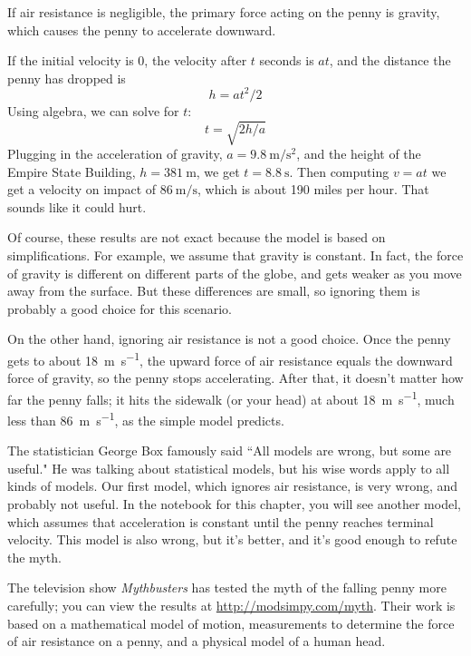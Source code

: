 \documentclass[12pt]{book}
\theoremstyle{exercise}
\begin{document}
If air resistance is negligible, the primary force acting on the penny is gravity, which causes the penny to accelerate downward.

If the initial velocity is 0, the velocity after $t$ seconds is $a t$, and the distance the penny has dropped is
%
\[ h = a t^2 / 2 \]
%
Using algebra, we can solve for $t$:
%
\[ t = \sqrt{ 2 h / a} \]
%
Plugging in the acceleration of gravity, $a = \SI{9.8}{\meter\per\second\squared}$, and the height of the Empire State Building, $h=\SI{381}{\meter}$, we get $t = \SI{8.8}{\second}$.  Then computing $v = a t$ we get a velocity on impact of $\SI{86}{\meter\per\second}$, which is about 190 miles per hour.  That sounds like it could hurt.

Of course, these results are not exact because the model is based on simplifications.  For example, we assume that gravity is constant.  In fact, the force of gravity is different on different parts of the globe, and gets weaker as you move away from the surface.  But these differences are small, so ignoring them is probably a good choice for this scenario.

On the other hand, ignoring air resistance is not a good choice.  Once the penny gets to about \SI{18}{\meter\per\second}, the upward force of air resistance equals the downward force of gravity, so the penny stops accelerating.  After that, it doesn't matter how far the penny falls; it hits the sidewalk (or your head) at about \SI{18}{\meter\per\second}, much less than \SI{86}{\meter\per\second}, as the simple model predicts.

The statistician George Box famously said ``All models are wrong, but some are useful."  He was talking about statistical models, but his wise words apply to all kinds of models.  Our first model, which ignores air resistance, is very wrong, and probably not useful.  In the notebook for this chapter, you will see another model, which assumes that acceleration is constant until the penny reaches terminal velocity.  This model is also wrong, but it's better, and it's good enough to refute the myth.


The television show {\it Mythbusters} has tested the myth of the falling penny more carefully; you can view the results at \url{http://modsimpy.com/myth}.  Their work is based on a mathematical model of motion, measurements to determine the force of air resistance on a penny, and a physical model of a human head.
\end{document}
